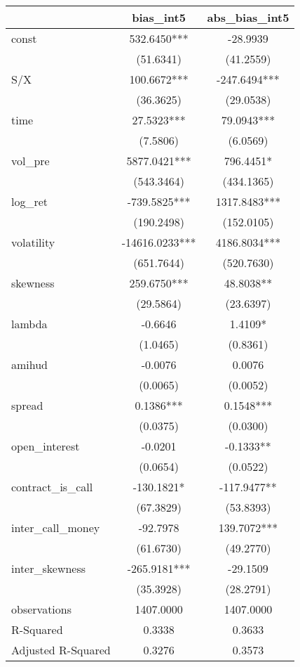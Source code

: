 \begin{tabular}{lcc}
\hline
                   &   bias\_int5   & abs\_bias\_int5  \\
\midrule
\midrule
const              & 532.6450***    & -28.9939         \\
                   & (51.6341)      & (41.2559)        \\
S/X                & 100.6672***    & -247.6494***     \\
                   & (36.3625)      & (29.0538)        \\
time               & 27.5323***     & 79.0943***       \\
                   & (7.5806)       & (6.0569)         \\
vol\_pre           & 5877.0421***   & 796.4451*        \\
                   & (543.3464)     & (434.1365)       \\
log\_ret           & -739.5825***   & 1317.8483***     \\
                   & (190.2498)     & (152.0105)       \\
volatility         & -14616.0233*** & 4186.8034***     \\
                   & (651.7644)     & (520.7630)       \\
skewness           & 259.6750***    & 48.8038**        \\
                   & (29.5864)      & (23.6397)        \\
lambda             & -0.6646        & 1.4109*          \\
                   & (1.0465)       & (0.8361)         \\
amihud             & -0.0076        & 0.0076           \\
                   & (0.0065)       & (0.0052)         \\
spread             & 0.1386***      & 0.1548***        \\
                   & (0.0375)       & (0.0300)         \\
open\_interest     & -0.0201        & -0.1333**        \\
                   & (0.0654)       & (0.0522)         \\
contract\_is\_call & -130.1821*     & -117.9477**      \\
                   & (67.3829)      & (53.8393)        \\
inter\_call\_money & -92.7978       & 139.7072***      \\
                   & (61.6730)      & (49.2770)        \\
inter\_skewness    & -265.9181***   & -29.1509         \\
                   & (35.3928)      & (28.2791)        \\
observations       & 1407.0000      & 1407.0000        \\
R-Squared          & 0.3338         & 0.3633           \\
Adjusted R-Squared & 0.3276         & 0.3573           \\
\hline
\end{tabular}